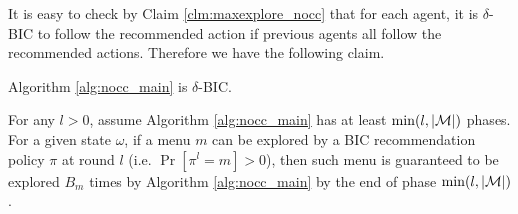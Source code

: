 It is easy to check by Claim \ref{clm:maxexplore_nocc} that for each agent, it is $\delta$-BIC to follow the recommended action if previous agents all follow the recommended actions. Therefore we have the following claim.
\begin{claim}
\label{clm:nocc_BIC}
Algorithm \ref{alg:nocc_main} is $\delta$-BIC.
\end{claim}


\begin{lemma}
\label{lem:exp_nocc}
For any $l > 0$, assume Algorithm \ref{alg:nocc_main} has at least $\min(l, |\mathcal{M}|)$ phases.
For a given state $\omega$, if a menu $m$ can be explored by a BIC recommendation policy $\pi$ at round $l$ (i.e. $ \Pr[\pi^l= m]> 0$), then such menu is guaranteed to be explored $B_m$ times by Algorithm \ref{alg:nocc_main} by the end of phase $\min(l, |\mathcal{M}|)$.
\end{lemma}

